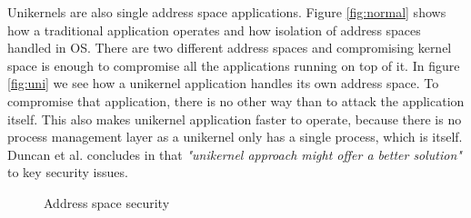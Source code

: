 Unikernels are also single address space applications. Figure \ref{fig:normal} shows how a traditional application operates and how isolation of address spaces handled in OS. There are two different address spaces and compromising kernel space is enough to compromise all the applications running on top of it. In figure \ref{fig:uni} we see how a unikernel application handles its own address space. To compromise that application, there is no other way than to attack the application itself. This also makes unikernel application faster to operate, because there is no process management layer as a unikernel only has a single process, which is itself. Duncan et al. concludes in \cite{Duncan2017} that \textit{"unikernel approach might offer a better solution"} to key security issues.
\begin{figure}[htbp]
    \centering
    \hfill
    \caption{Address space security}\label{fig:single-space}
  \end{figure}

